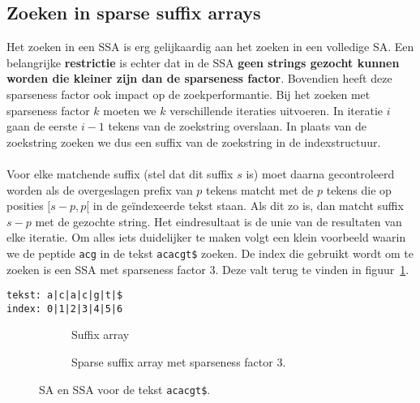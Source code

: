 \subsection{Zoeken in sparse suffix arrays}\label{subsec:zoeken-in-sparse-suffix-arrays}
Het zoeken in een SSA is erg gelijkaardig aan het zoeken in een volledige SA\@.
Een belangrijke \textbf{restrictie} is echter dat in de SSA \textbf{geen strings gezocht kunnen worden die kleiner zijn dan de sparseness factor}.
Bovendien heeft deze sparseness factor ook impact op de zoekperformantie.
Bij het zoeken met sparseness factor $k$ moeten we $k$ verschillende iteraties uitvoeren.
In iteratie $i$ gaan de eerste $i - 1$ tekens van de zoekstring overslaan.
In plaats van de zoekstring zoeken we dus een suffix van de zoekstring in de indexstructuur.
\\ \\
Voor elke matchende suffix (stel dat dit suffix $s$ is) moet daarna gecontroleerd worden als de overgeslagen prefix van $p$ tekens matcht met de $p$ tekens die op posities $[s - p, p[$ in de geïndexeerde tekst staan.
Als dit zo is, dan matcht suffix $s - p$ met de gezochte string.
Het eindresultaat is de unie van de resultaten van elke iteratie.
Om alles iets duidelijker te maken volgt een klein voorbeeld waarin we de peptide \texttt{acg} in de tekst \texttt{acacgt\$} zoeken.
De index die gebruikt wordt om te zoeken is een SSA met sparseness factor 3.
Deze valt terug te vinden in figuur~\ref{fig:sparse_sa}.

\begin{center}
    \texttt{tekst: a|c|a|c|g|t|\$\\index: 0|1|2|3|4|5|6}
\end{center}
\begin{figure}[H]
    \hfill
    \begin{subfigure}[t]{0.45\linewidth}
        \centering
        \caption{Suffix array}
    \end{subfigure}
    \hfill
    \begin{subfigure}[t]{0.45\linewidth}
        \centering
        \caption{Sparse suffix array met sparseness factor 3.}
    \end{subfigure}
    \hfill
    \caption{SA en SSA voor de tekst \texttt{acacgt\$}.}
    \label{fig:sparse_sa}
\end{figure}

